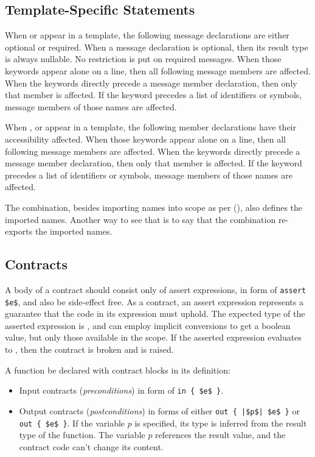 \subsection{Template-Specific Statements}

When  or  appear in a template, the following message declarations are either optional or required. When a message declaration is optional, then its result type is always nullable. No restriction is put on required messages. When those keywords appear alone on a line, then all following message members are affected. When the keywords directly precede a message member declaration, then only that member is affected. If the keyword precedes a list of identifiers or symbols, message members of those names are affected. 

When ,  or  appear in a template, the following member declarations have their accessibility affected. When those keywords appear alone on a line, then all following message members are affected. When the keywords directly precede a message member declaration, then only that member is affected. If the keyword precedes a list of identifiers or symbols, message members of those names are affected. 

The  combination, besides importing names into scope as per (), also defines the imported names. Another way to see that is to say that the combination re-exports the imported names. 





\subsection{Contracts}

A body of a contract should consist only of assert expressions, in form of \lstinline!assert $e$!, and also be side-effect free. As a contract, an assert expression represents a guarantee that the code in its expression must uphold. The expected type of the asserted expression is , and can employ implicit conversions to get a boolean value, but only those available in the scope. If the asserted expression evaluates to , then the contract is broken and  is raised. 

A function be declared with contract blocks in its definition:
\begin{itemize}
  \item Input contracts ({\em preconditions}) in form of \lstinline!in { $e$ }!.
  \item Output contracts ({\em postconditions}) in forms of either \lstinline!out { |$p$| $e$ }! or \lstinline!out { $e$ }!. If the variable $p$ is specified, its type is inferred from the result type of the function. The variable $p$ references the result value, and the contract code can't change its content. 
\end{itemize}

